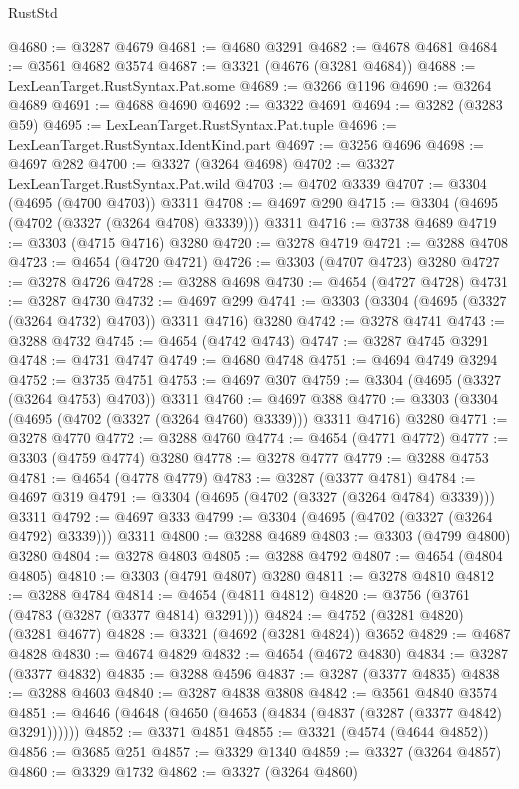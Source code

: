\begin{lexlean}{RustStd}
\begin{coremodule}
{\begin{coremodule}
{{{{{{{{{{{{{{{{{{{{{{{{{{{{{{{{{@4680 := @3287 @4679
@4681 := @4680 @3291
@4682 := @4678 @4681
@4684 := @3561 @4682 @3574
@4687 := @3321 (@4676 (@3281 @4684))
@4688 := LexLeanTarget.RustSyntax.Pat.some
@4689 := @3266 @1196
@4690 := @3264 @4689
@4691 := @4688 @4690
@4692 := @3322 @4691
@4694 := @3282 (@3283 @59)
@4695 := LexLeanTarget.RustSyntax.Pat.tuple
@4696 := LexLeanTarget.RustSyntax.IdentKind.part
@4697 := @3256 @4696
@4698 := @4697 @282
@4700 := @3327 (@3264 @4698)
@4702 := @3327 LexLeanTarget.RustSyntax.Pat.wild
@4703 := @4702 @3339
@4707 := @3304 (@4695 (@4700 @4703)) @3311
@4708 := @4697 @290
@4715 := @3304 (@4695 (@4702 (@3327 (@3264 @4708) @3339))) @3311
@4716 := @3738 @4689
@4719 := @3303 (@4715 @4716) @3280
@4720 := @3278 @4719
@4721 := @3288 @4708
@4723 := @4654 (@4720 @4721)
@4726 := @3303 (@4707 @4723) @3280
@4727 := @3278 @4726
@4728 := @3288 @4698
@4730 := @4654 (@4727 @4728)
@4731 := @3287 @4730
@4732 := @4697 @299
@4741 := @3303 (@3304 (@4695 (@3327 (@3264 @4732) @4703)) @3311 @4716) @3280
@4742 := @3278 @4741
@4743 := @3288 @4732
@4745 := @4654 (@4742 @4743)
@4747 := @3287 @4745 @3291
@4748 := @4731 @4747
@4749 := @4680 @4748
@4751 := @4694 @4749 @3294
@4752 := @3735 @4751
@4753 := @4697 @307
@4759 := @3304 (@4695 (@3327 (@3264 @4753) @4703)) @3311
@4760 := @4697 @388
@4770 := @3303 (@3304 (@4695 (@4702 (@3327 (@3264 @4760) @3339))) @3311 @4716) @3280
@4771 := @3278 @4770
@4772 := @3288 @4760
@4774 := @4654 (@4771 @4772)
@4777 := @3303 (@4759 @4774) @3280
@4778 := @3278 @4777
@4779 := @3288 @4753
@4781 := @4654 (@4778 @4779)
@4783 := @3287 (@3377 @4781)
@4784 := @4697 @319
@4791 := @3304 (@4695 (@4702 (@3327 (@3264 @4784) @3339))) @3311
@4792 := @4697 @333
@4799 := @3304 (@4695 (@4702 (@3327 (@3264 @4792) @3339))) @3311
@4800 := @3288 @4689
@4803 := @3303 (@4799 @4800) @3280
@4804 := @3278 @4803
@4805 := @3288 @4792
@4807 := @4654 (@4804 @4805)
@4810 := @3303 (@4791 @4807) @3280
@4811 := @3278 @4810
@4812 := @3288 @4784
@4814 := @4654 (@4811 @4812)
@4820 := @3756 (@3761 (@4783 (@3287 (@3377 @4814) @3291)))
@4824 := @4752 (@3281 @4820) (@3281 @4677)
@4828 := @3321 (@4692 (@3281 @4824)) @3652
@4829 := @4687 @4828
@4830 := @4674 @4829
@4832 := @4654 (@4672 @4830)
@4834 := @3287 (@3377 @4832)
@4835 := @3288 @4596
@4837 := @3287 (@3377 @4835)
@4838 := @3288 @4603
@4840 := @3287 @4838 @3808
@4842 := @3561 @4840 @3574
@4851 := @4646 (@4648 (@4650 (@4653 (@4834 (@4837 (@3287 (@3377 @4842) @3291))))))
@4852 := @3371 @4851
@4855 := @3321 (@4574 (@4644 @4852))
@4856 := @3685 @251
@4857 := @3329 @1340
@4859 := @3327 (@3264 @4857)
@4860 := @3329 @1732
@4862 := @3327 (@3264 @4860)
}}}}}}}}}}}}}}}}}}}}}}}}}}}}}}}}}
\end{coremodule}}
\end{coremodule}
\end{lexlean}

